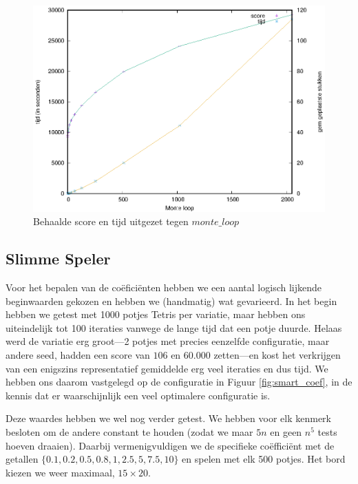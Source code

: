 \documentclass[10pt]{article}
\begin{document}
\begin{figure}
\begin{center}
\includegraphics{carlo.eps}
\caption{Behaalde score en tijd uitgezet tegen $monte\_loop$}\label{fig:monte_score}

\end{center}
\end{figure}



\subsection{Slimme Speler}
Voor het bepalen van de co\"efici\"enten hebben we een aantal logisch lijkende beginwaarden gekozen en hebben we (handmatig) wat gevarieerd. In het begin hebben we getest met 1000 potjes Tetris per variatie, maar hebben ons uiteindelijk tot 100 iteraties vanwege de lange tijd dat een potje duurde. Helaas werd de variatie erg groot---2 potjes met precies eenzelfde configuratie, maar andere seed, hadden een score van $106$ en $60.000$ zetten---en kost het verkrijgen van een enigszins representatief gemiddelde erg veel iteraties en dus tijd. We hebben ons daarom vastgelegd op de configuratie in Figuur \ref{fig:smart_coef}, in de kennis dat er waarschijnlijk een veel optimalere configuratie is.

Deze waardes hebben we wel nog verder getest. We hebben voor elk kenmerk besloten om de andere constant te houden (zodat we maar $5n$ en geen $n^5$ tests hoeven draaien). Daarbij vermenigvuldigen we de specifieke co\"effici\"ent met de getallen $\{0.1, 0.2, 0.5, 0.8, 1, 2.5, 5, 7.5, 10 \}$ en spelen met elk 500 potjes. Het bord kiezen we weer maximaal, $15 \times 20$.
\end{document}
